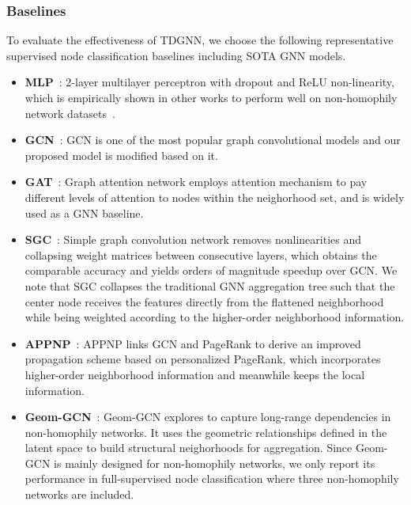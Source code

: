 \subsubsection{Baselines}
To evaluate the effectiveness of TDGNN, we choose the following representative supervised node classification baselines including SOTA GNN models.
\begin{itemize}[leftmargin=0.6cm]

    \item \textbf{MLP}~\cite{murtagh1991multilayer}: 2-layer multilayer perceptron with dropout and ReLU non-linearity, which is empirically shown in other works to perform well on non-homophily network datasets~\cite{zhu2020beyond}.
    
    \item \textbf{GCN}~\cite{GCN}: GCN is one of the most popular graph convolutional models and our proposed model is modified based on it.
    
    \item \textbf{GAT}~\cite{GAT}: Graph attention network employs attention mechanism to pay different levels of attention to nodes within the neighorhood set, and is widely used as a GNN baseline. 
    
    \item \textbf{SGC}~\cite{SGC}: Simple graph convolution network removes nonlinearities and collapsing weight matrices between consecutive layers, which obtains the comparable accuracy and yields orders of magnitude speedup over GCN. We note that SGC collapses the traditional GNN aggregation tree such that the center node receives the features directly from the flattened neighborhood while being weighted according to the higher-order neighborhood information.
    
    \item \textbf{APPNP}~\cite{APPNP}: APPNP links GCN and PageRank to derive an improved propagation scheme based on personalized PageRank, which incorporates higher-order neighborhood information and meanwhile keeps the local information.
    
    \item \textbf{Geom-GCN}~\cite{geomgcn}: Geom-GCN explores to capture long-range dependencies in non-homophily networks. It uses the geometric relationships defined in the latent space to build structural neighorhoods for aggregation. Since Geom-GCN is mainly designed for non-homophily networks, we only report its performance in full-supervised node classification where three non-homophily networks are included.
    

\end{itemize}
